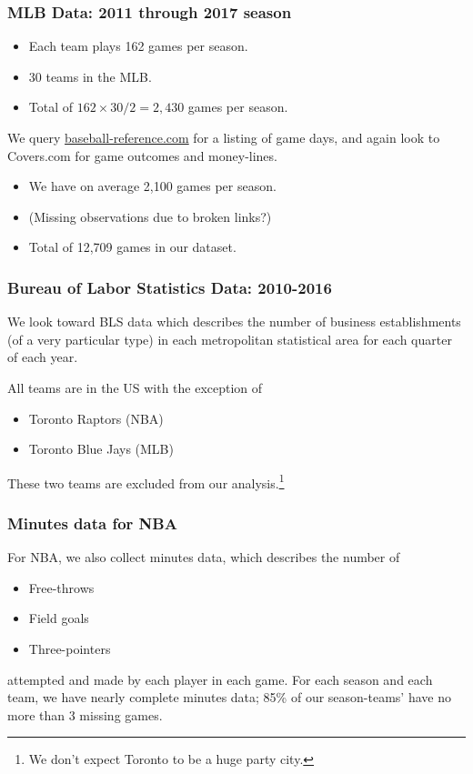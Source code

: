\documentclass{beamer}
\begin{document}
\begin{frame}   \frametitle{MLB Data: 2011 through 2017 season}
  \begin{itemize}     \item Each team plays 162 games per season.
    \item 30 teams in the MLB.
    \item Total of $162 \times 30 / 2 = 2,430$ games per season.   \end{itemize}
  
  We query \href{http://www.baseball-reference.com/leagues/}{baseball-reference.com}
  for a listing of game days, and again look to Covers.com for game outcomes and money-lines.
  
  \begin{itemize}     \item We have on average 2,100 games per season.
    \item (Missing observations due to broken links?)
    \item Total of 12,709 games in our dataset.    \end{itemize} \end{frame}

\begin{frame}   \frametitle{Bureau of Labor Statistics Data: 2010-2016}
  We look toward BLS data which describes the number of business establishments 
  (of a very particular type) in each metropolitan statistical area
  for each quarter of each year.
  
  All teams are in the US with the exception of 
  \begin{itemize}     \item Toronto Raptors (NBA)
    \item Toronto Blue Jays (MLB)   \end{itemize} 

  These two teams are excluded from our analysis.\footnote{We don't expect Toronto to be a huge party city.} \end{frame}

\begin{frame}   \frametitle{Minutes data for NBA}
  For NBA, we also collect minutes data, which describes the number of 
  \begin{itemize}     \item Free-throws
    \item Field goals
    \item Three-pointers   \end{itemize}
  attempted and made by each player in each game. For each season and each team,
  we have nearly complete minutes data; 85\% of our season-teams' have no more than
  3 missing games. \end{frame}
\end{document}
